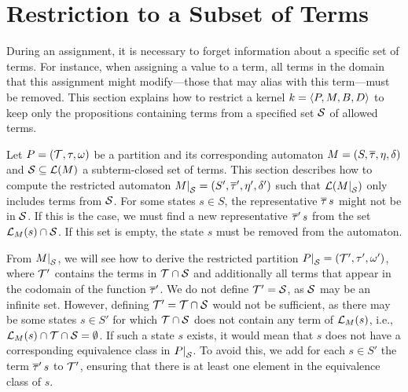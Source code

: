 \section{Restriction to a Subset of Terms}

During an assignment, it is necessary to forget information about a specific set of terms.
For instance, when assigning a value to a term, all terms in the domain that this assignment might modify---those that may alias with this term---must be removed.
This section explains how to restrict a kernel $k = \langle P, M, B, D\rangle$
to keep only the propositions containing terms from a specified set $\mathcal{S}$ of allowed terms.

Let $P = (\mathcal{T}, \tau, \omega)$ be a partition and its corresponding automaton $M = (S, \overline{\tau}, \eta, \delta)$ and $\mathcal{S} \subseteq \mathcal{L}(M)$ a subterm-closed set of terms.
This section describes how to compute the restricted automaton $\restr{M}{\Set} = (S', \otau', \eta', \delta')$ such that $\L(\restr{M}{\Set})$ only includes terms from $\mathcal{S}$.
For some states $s \in S$, the representative $\overline{\tau}\,s$ might not be in $\mathcal{S}$.
If this is the case, we must find a new representative $\overline{\tau}'\,s$ from the set $\mathcal{L}_{M}(s) \cap \mathcal{S}$.
If this set is empty, the state $s$ must be removed from the automaton.

From $\restr{M}{\Set}$, we will see how to derive the restricted partition $\restr{P}{\Set} = (\T', \tau', \omega')$, where $\mathcal{T}'$ contains the terms in $\mathcal{T} \cap \mathcal{S}$ and additionally all terms that appear in the codomain of the function $\overline{\tau}'$.
We do not define $\mathcal{T}' = \mathcal{S}$, as $\mathcal{S}$ may be an infinite set.
However, defining $\mathcal{T}' = \mathcal{T} \cap \mathcal{S}$ would not be sufficient, as there may be some states $s \in S'$ for which
$\mathcal{T} \cap \mathcal{S}$ does not contain any term of $\mathcal{L}_{M}(s)$, i.e.,
$\mathcal{L}_{M}(s) \cap \mathcal{T} \cap \mathcal{S} = \emptyset$.
If such a state $s$ exists, it would mean that $s$ does not have a corresponding equivalence class in $\restr{P}{\Set}$.
To avoid this, we add for each $s \in S'$ the term $\overline{\tau}'\,s$ to $\mathcal{T}'$, ensuring that there is at least one element in the equivalence class of $s$.

